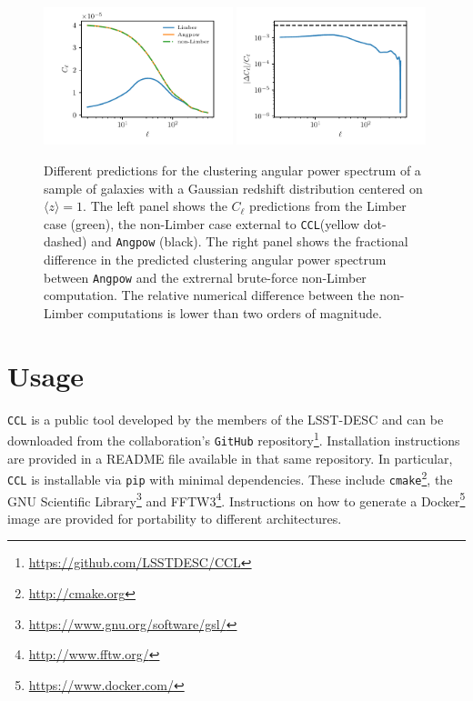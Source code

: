 \documentclass[\docopts]{\docclass}
\newcommand{\ccl}{{\tt CCL}\xspace}
\begin{document}
\begin{figure}[htbp]
\centering
\includegraphics[width=0.49\textwidth]{angpow1}
\includegraphics[width=0.49\textwidth]{angpow3}
\caption{Different predictions for the clustering angular power spectrum of a sample of galaxies with a Gaussian redshift distribution centered on $\langle z \rangle =1$. The left panel shows the $C_\ell$ predictions from the Limber case (green), the non-Limber case external to \ccl (yellow dot-dashed) and {\tt Angpow} (black). The right panel shows the fractional difference in the predicted clustering angular power spectrum between {\tt Angpow} and the extrernal brute-force non-Limber computation. The relative numerical difference between the non-Limber computations is lower than two orders of magnitude.}
\label{fig:angpow}
\end{figure}

\section{Usage}
\label{sec:usage}

\ccl is a public tool developed by the members of the LSST-DESC and can be downloaded from the collaboration's {\tt GitHub} repository\footnote{\url{https://github.com/LSSTDESC/CCL}}. Installation instructions are provided in a README file available in that same repository. In particular, \ccl is installable via {\tt pip} with minimal dependencies. These include {\tt cmake}\footnote{\url{http://cmake.org}}, the GNU Scientific Library\footnote{\url{https://www.gnu.org/software/gsl/}} and FFTW3\footnote{\url{http://www.fftw.org/}}. Instructions on how to generate a Docker\footnote{\url{https://www.docker.com/}} image are provided for portability to different architectures.
\end{document}
